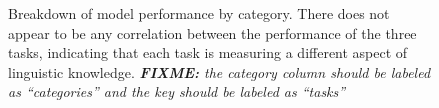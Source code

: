 \documentclass[11pt,a4paper]{article}
\DeclareMathOperator{\topk}{\texttt{Topk}}
\newcommand{\fixme}[1]{{\color{red}\itshape \textbf{FIXME:} {#1}}}
\begin{document}
\begin{figure}
\centering

\caption{
    Breakdown of model performance by category.
    There does not appear to be any correlation between the performance of the three tasks,
    indicating that each task is measuring a different aspect of linguistic knowledge.
    \fixme{the category column should be labeled as ``categories'' and the key should be labeled as ``tasks''}
   }
\label{fig:cross_cat_acc}
\end{figure}
\end{document}
